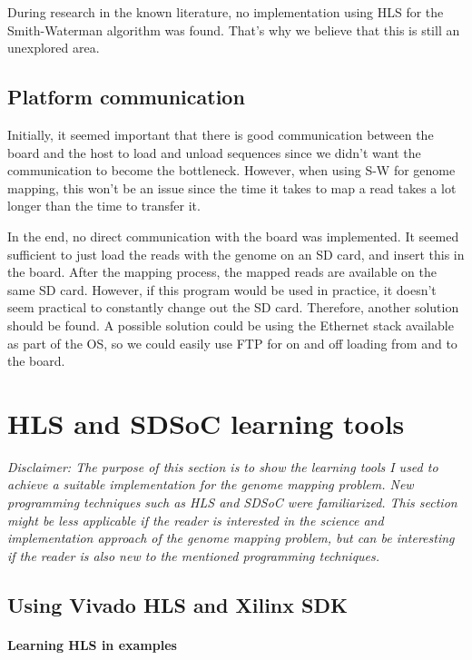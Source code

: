 During research in the known literature, no implementation using HLS for the Smith-Waterman algorithm was found. That's why we believe that this is still an unexplored area.

\subsection{Platform communication}

Initially, it seemed important that there is good communication between the board and the host to load and unload sequences since we didn't want the communication to become the bottleneck. However, when using S-W for genome mapping, this won't be an issue since the time it takes to map a read takes a lot longer than the time to transfer it.

In the end, no direct communication with the board was implemented. It seemed sufficient to just load the reads with the genome on an SD card, and insert this in the board. After the mapping process, the mapped reads are available on the same SD card. However, if this program would be used in practice, it doesn't seem practical to constantly change out the SD card. Therefore, another solution should be found. A possible solution could be using the Ethernet stack available as part of the OS, so we could easily use FTP for on and off loading from and to the board.

\section{HLS and SDSoC learning tools}
\label{ch:InitDiff}

\textit{Disclaimer: The purpose of this section is to show the learning tools I used to achieve a suitable implementation for the genome mapping problem. New programming techniques such as HLS and SDSoC were familiarized. This section might be less applicable if the reader is interested in the science and implementation approach of the genome mapping problem, but can be interesting if the reader is also new to the mentioned programming techniques.}

\subsection{Using Vivado HLS and Xilinx SDK}

\paragraph{Learning HLS in examples}
\label{HLS}

